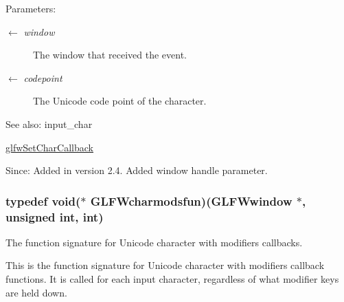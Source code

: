 \begin{Desc}
\item[Parameters:]
\begin{description}
\item[\mbox{$\leftarrow$} {\em window}]The window that received the event. \item[\mbox{$\leftarrow$} {\em codepoint}]The Unicode code point of the character.\end{description}
\end{Desc}
\begin{Desc}
\item[See also:]input\_\-char 

\hyperlink{group__input_g07b2959b23dc3e466ce7475746021002}{glfwSetCharCallback}\end{Desc}
\begin{Desc}
\item[Since:]Added in version 2.4.  Added window handle parameter. \end{Desc}
\hypertarget{group__input_g3826e9cf33f760c1480d6ce873f9d002}{
\subsubsection[GLFWcharmodsfun]{\setlength{\rightskip}{0pt plus 5cm}typedef void($\ast$  {\bf GLFWcharmodsfun})({\bf GLFWwindow} $\ast$, unsigned int, int)}}
\label{group__input_g3826e9cf33f760c1480d6ce873f9d002}


The function signature for Unicode character with modifiers callbacks. 

This is the function signature for Unicode character with modifiers callback functions. It is called for each input character, regardless of what modifier keys are held down.


